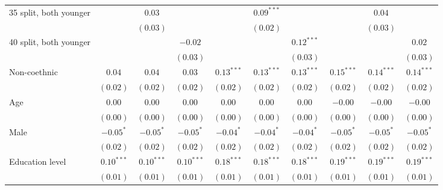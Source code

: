 \begin{table}
\begin{center}
\begin{threeparttable}
\begin{tabular}{l c c c c c c c c c}
35 split, both younger          &               & $0.03$        &               &               & $0.09^{***}$  &               &               & $0.04$        &               \\
                                &               & $(0.03)$      &               &               & $(0.02)$      &               &               & $(0.03)$      &               \\
40 split, both younger          &               &               & $-0.02$       &               &               & $0.12^{***}$  &               &               & $0.02$        \\
                                &               &               & $(0.03)$      &               &               & $(0.03)$      &               &               & $(0.03)$      \\
Non-coethnic                    & $0.04$        & $0.04$        & $0.03$        & $0.13^{***}$  & $0.13^{***}$  & $0.13^{***}$  & $0.15^{***}$  & $0.14^{***}$  & $0.14^{***}$  \\
                                & $(0.02)$      & $(0.02)$      & $(0.02)$      & $(0.02)$      & $(0.02)$      & $(0.02)$      & $(0.02)$      & $(0.02)$      & $(0.02)$      \\
Age                             & $0.00$        & $0.00$        & $0.00$        & $0.00$        & $0.00$        & $0.00$        & $-0.00$       & $-0.00$       & $-0.00$       \\
                                & $(0.00)$      & $(0.00)$      & $(0.00)$      & $(0.00)$      & $(0.00)$      & $(0.00)$      & $(0.00)$      & $(0.00)$      & $(0.00)$      \\
Male                            & $-0.05^{*}$   & $-0.05^{*}$   & $-0.05^{*}$   & $-0.04^{*}$   & $-0.04^{*}$   & $-0.04^{*}$   & $-0.05^{*}$   & $-0.05^{*}$   & $-0.05^{*}$   \\
                                & $(0.02)$      & $(0.02)$      & $(0.02)$      & $(0.02)$      & $(0.02)$      & $(0.02)$      & $(0.02)$      & $(0.02)$      & $(0.02)$      \\
Education level                 & $0.10^{***}$  & $0.10^{***}$  & $0.10^{***}$  & $0.18^{***}$  & $0.18^{***}$  & $0.18^{***}$  & $0.19^{***}$  & $0.19^{***}$  & $0.19^{***}$  \\
                                & $(0.01)$      & $(0.01)$      & $(0.01)$      & $(0.01)$      & $(0.01)$      & $(0.01)$      & $(0.01)$      & $(0.01)$      & $(0.01)$      \\

\end{tabular}
\end{threeparttable}
\end{center}
\end{table}

